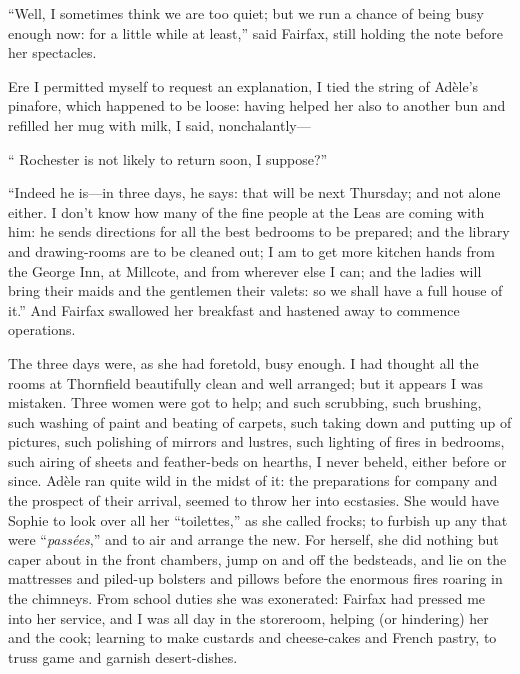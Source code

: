 \enquote{Well, I sometimes think we are too quiet; but we run a chance
	of being busy enough now: for a little while at least,} said \Mrs{}
Fairfax, still holding the note before her spectacles.

Ere I permitted myself to request an explanation, I tied the string of
Adèle's pinafore, which happened to be loose: having helped her also to
another bun and refilled her mug with milk, I said, nonchalantly---

\enquote{\Mr{} Rochester is not likely to return soon, I suppose?}

\enquote{Indeed he is---in three days, he says: that will be next
	Thursday; and not alone either. I don't know how many of the fine
	people at the Leas are coming with him: he sends directions for all the
	best bedrooms to be prepared; and the library and drawing-rooms are to
	be cleaned out; I am to get more kitchen hands from the George Inn, at
	Millcote, and from wherever else I can; and the ladies will bring their
	maids and the gentlemen their valets: so we shall have a full house of
	it.} And \Mrs{} Fairfax swallowed her breakfast and hastened away to
commence operations.

The three days were, as she had foretold, busy enough. I had thought
all the rooms at Thornfield beautifully clean and well arranged; but it
appears I was mistaken. Three women were got to help; and such
scrubbing, such brushing, such washing of paint and beating of carpets,
such taking down and putting up of pictures, such polishing of mirrors
and lustres, such lighting of fires in bedrooms, such airing of sheets
and feather-beds on hearths, I never beheld, either before or since.
Adèle ran quite wild in the midst of it: the preparations for company
and the prospect of their arrival, seemed to throw her into ecstasies.
She would have Sophie to look over all her \foreignquote{french}{toilettes,} as she
called frocks; to furbish up any that were \foreignquote{french}{\emph{passées},} and to
air and arrange the new. For herself, she did nothing but caper about
in the front chambers, jump on and off the bedsteads, and lie on the
mattresses and piled-up bolsters and pillows before the enormous fires
roaring in the chimneys. From school duties she was exonerated: \Mrs{}
Fairfax had pressed me into her service, and I was all day in the
storeroom, helping (or hindering) her and the cook; learning to make
custards and cheese-cakes and French pastry, to truss game and garnish
desert-dishes.

